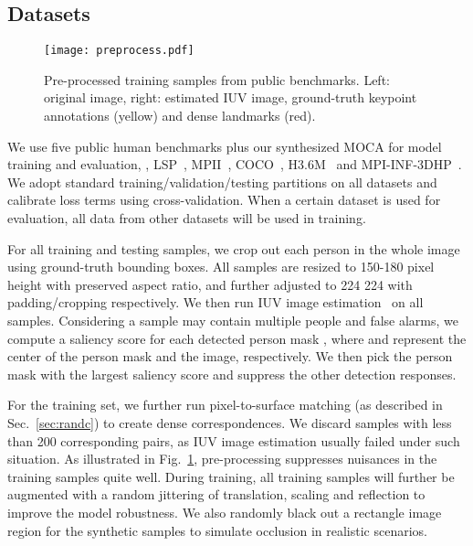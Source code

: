 \documentclass[10pt,twocolumn,letterpaper]{article}
\newcommand{\beforefigcaption}{\vspace{0mm}}
\newcommand{\afterfigcaption}{\vspace{0mm}}
\newcommand{\beforesubsection}{\vspace{0mm}}
\newcommand{\aftersubsection}{\vspace{0mm}}
\begin{document}
\beforesubsection
\subsection{Datasets}
\aftersubsection

\begin{figure}[ptb]
\centering
\texttt{[image: preprocess.pdf]}
\beforefigcaption
\caption{Pre-processed training samples from public benchmarks. Left: original image, right: estimated IUV image, ground-truth keypoint annotations (yellow) and dense landmarks (red).}
\afterfigcaption
\label{fig:sample}
\end{figure}

We use five public human benchmarks plus our synthesized MOCA for model training and evaluation, \ie, LSP~\cite{LSPDataset}, MPII~\cite{MPIIDataset}, COCO~\cite{COCODataset}, H3.6M~\cite{ionescu2011human3,ionescu2014human3} and MPI-INF-3DHP~\cite{Mehta3DV17}. We adopt standard training/validation/testing partitions on all datasets and calibrate loss terms using cross-validation. When a certain dataset is used for evaluation, all data from other datasets will be used in training.

For all training and testing samples, we crop out each person in the whole image using ground-truth bounding boxes. All samples are resized to 150-180 pixel height with preserved aspect ratio, and further adjusted to 224  224 with padding/cropping respectively. We then run IUV image estimation~\cite{DensePose2018} on all samples. Considering a sample  may contain multiple people and false alarms, we compute a saliency score  for each detected person mask , where  and  represent the center of the person mask and the image, respectively. We then pick the person mask with the largest saliency score and suppress the other detection responses. 

For the training set, we further run pixel-to-surface matching (as described in Sec.~\ref{sec:randc}) to create dense correspondences. We discard samples with less than 200 corresponding pairs, as IUV image estimation usually failed under such situation. As illustrated in Fig.~\ref{fig:sample}, pre-processing suppresses nuisances in the training samples quite well. During training, all training samples will further be augmented with a random jittering of translation, scaling and reflection to improve the model robustness. We also randomly black out a rectangle image region for the synthetic samples to simulate occlusion in realistic scenarios.
\end{document}
